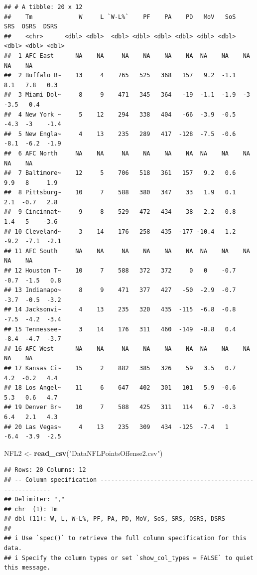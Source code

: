 \documentclass[
]{article}
\newenvironment{Shaded}{\begin{snugshade}}{\end{snugshade}}
\newcommand{\FunctionTok}[1]{\textcolor[rgb]{0.13,0.29,0.53}{\textbf{#1}}}
\newcommand{\NormalTok}[1]{#1}
\newcommand{\OtherTok}[1]{\textcolor[rgb]{0.56,0.35,0.01}{#1}}
\newcommand{\StringTok}[1]{\textcolor[rgb]{0.31,0.60,0.02}{#1}}
\begin{document}
\begin{verbatim}
## # A tibble: 20 x 12
##    Tm             W     L `W-L%`    PF    PA    PD   MoV   SoS   SRS  OSRS  DSRS
##    <chr>      <dbl> <dbl>  <dbl> <dbl> <dbl> <dbl> <dbl> <dbl> <dbl> <dbl> <dbl>
##  1 AFC East      NA    NA     NA    NA    NA    NA  NA    NA    NA    NA    NA  
##  2 Buffalo B~    13     4    765   525   368   157   9.2  -1.1   8.1   7.8   0.3
##  3 Miami Dol~     8     9    471   345   364   -19  -1.1  -1.9  -3    -3.5   0.4
##  4 New York ~     5    12    294   338   404   -66  -3.9  -0.5  -4.3  -3    -1.4
##  5 New Engla~     4    13    235   289   417  -128  -7.5  -0.6  -8.1  -6.2  -1.9
##  6 AFC North     NA    NA     NA    NA    NA    NA  NA    NA    NA    NA    NA  
##  7 Baltimore~    12     5    706   518   361   157   9.2   0.6   9.9   8     1.9
##  8 Pittsburg~    10     7    588   380   347    33   1.9   0.1   2.1  -0.7   2.8
##  9 Cincinnat~     9     8    529   472   434    38   2.2  -0.8   1.4   5    -3.6
## 10 Cleveland~     3    14    176   258   435  -177 -10.4   1.2  -9.2  -7.1  -2.1
## 11 AFC South     NA    NA     NA    NA    NA    NA  NA    NA    NA    NA    NA  
## 12 Houston T~    10     7    588   372   372     0   0    -0.7  -0.7  -1.5   0.8
## 13 Indianapo~     8     9    471   377   427   -50  -2.9  -0.7  -3.7  -0.5  -3.2
## 14 Jacksonvi~     4    13    235   320   435  -115  -6.8  -0.8  -7.5  -4.2  -3.4
## 15 Tennessee~     3    14    176   311   460  -149  -8.8   0.4  -8.4  -4.7  -3.7
## 16 AFC West      NA    NA     NA    NA    NA    NA  NA    NA    NA    NA    NA  
## 17 Kansas Ci~    15     2    882   385   326    59   3.5   0.7   4.2  -0.2   4.4
## 18 Los Angel~    11     6    647   402   301   101   5.9  -0.6   5.3   0.6   4.7
## 19 Denver Br~    10     7    588   425   311   114   6.7  -0.3   6.4   2.1   4.3
## 20 Las Vegas~     4    13    235   309   434  -125  -7.4   1    -6.4  -3.9  -2.5
\end{verbatim}

\begin{Shaded}
\begin{Highlighting}[]
\NormalTok{NFL2 }\OtherTok{\textless{}{-}} \FunctionTok{read\_csv}\NormalTok{(}\StringTok{"DataNFLPointsOffense2.csv"}\NormalTok{)}
\end{Highlighting}
\end{Shaded}

\begin{verbatim}
## Rows: 20 Columns: 12
## -- Column specification --------------------------------------------------------
## Delimiter: ","
## chr  (1): Tm
## dbl (11): W, L, W-L%, PF, PA, PD, MoV, SoS, SRS, OSRS, DSRS
## 
## i Use `spec()` to retrieve the full column specification for this data.
## i Specify the column types or set `show_col_types = FALSE` to quiet this message.
\end{verbatim}
\end{document}

